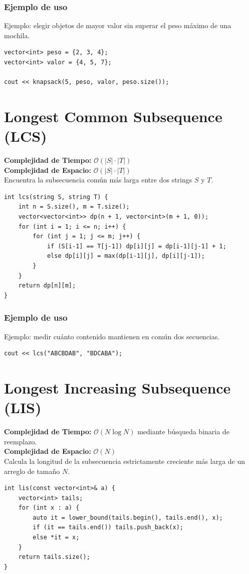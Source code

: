 \documentclass[10pt,twocolumn,letterpaper]{report}
\begin{document}
\subsubsection*{Ejemplo de uso}
Ejemplo: elegir objetos de mayor valor sin superar el peso máximo de una mochila.
\begin{lstlisting}
vector<int> peso = {2, 3, 4};
vector<int> valor = {4, 5, 7};

cout << knapsack(5, peso, valor, peso.size());
\end{lstlisting}

\section{Longest Common Subsequence (LCS)}
\textbf{Complejidad de Tiempo:} $\mathcal{O}(|S| \cdot |T|)$ \\
\textbf{Complejidad de Espacio:} $\mathcal{O}(|S| \cdot |T|)$ \\
Encuentra la subsecuencia común más larga entre dos strings $S$ y $T$.
\begin{lstlisting}
int lcs(string S, string T) {
    int n = S.size(), m = T.size();
    vector<vector<int>> dp(n + 1, vector<int>(m + 1, 0));
    for (int i = 1; i <= n; i++) {
        for (int j = 1; j <= m; j++) {
            if (S[i-1] == T[j-1]) dp[i][j] = dp[i-1][j-1] + 1;
            else dp[i][j] = max(dp[i-1][j], dp[i][j-1]);
        }
    }
    return dp[n][m];
}
\end{lstlisting}
\subsubsection*{Ejemplo de uso}
Ejemplo: medir cuánto contenido mantienen en común dos secuencias.
\begin{lstlisting}
cout << lcs("ABCBDAB", "BDCABA");
\end{lstlisting}

\section{Longest Increasing Subsequence (LIS)}
\textbf{Complejidad de Tiempo:} $\mathcal{O}(N \log N)$ mediante búsqueda binaria de reemplazo. \\
\textbf{Complejidad de Espacio:} $\mathcal{O}(N)$ \\
Calcula la longitud de la subsecuencia estrictamente creciente más larga de un arreglo de tamaño $N$.
\begin{lstlisting}
int lis(const vector<int>& a) {
    vector<int> tails;
    for (int x : a) {
        auto it = lower_bound(tails.begin(), tails.end(), x);
        if (it == tails.end()) tails.push_back(x);
        else *it = x;
    }
    return tails.size();
}
\end{lstlisting}
\end{document}
